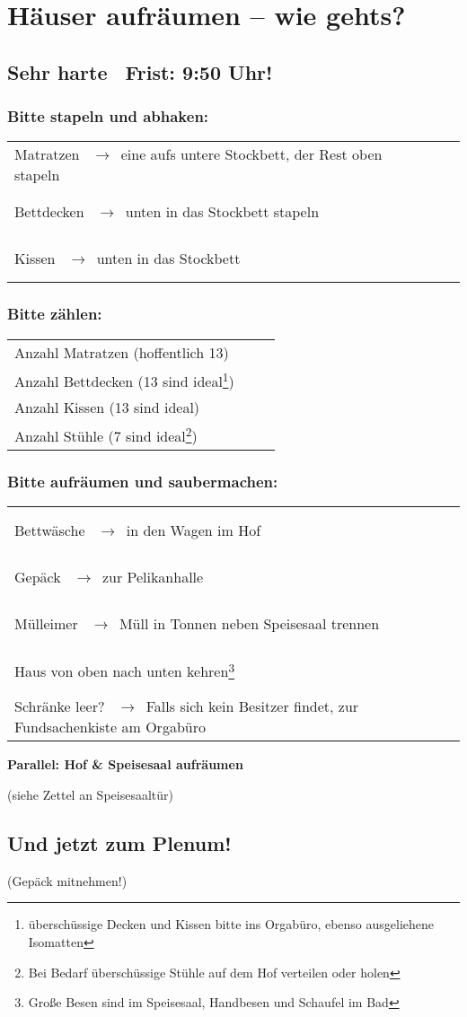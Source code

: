 \documentclass[14pt,parskip=full+]{scrartcl}
\newcommand{\checkfield}{~ \hfill ~\raisebox{-5pt}{\tikz\node[draw,minimum width=16.8pt,minimum height=16.8pt]{};}}
\newcommand{\countfield}{~ \hfill ~\raisebox{-5pt}{\tikz\node[draw,minimum width=33.6pt,minimum height=16.8pt]{};}}
\newcommand{\pfeil}{~\ensuremath{\rightarrow}~}
\newcommand{\mysection}[1]{\vspace{-.7\baselineskip}\subsubsection*{#1} \vspace{-.7\baselineskip}}
\begin{document}
\parbox[t]{.8\textwidth}{\vskip0pt
\section*{Häuser aufräumen -- wie gehts?}
\subsection*{Sehr harte\footnotemark~ Frist: 9:50 Uhr!}
}
\parbox[t]{.2\textwidth}{\vskip0pt 
}

\bigskip

\def\arraystretch{1.3}

\mysection{Bitte stapeln und abhaken:}
\begin{tabularx}{\textwidth}{Xc}
Matratzen \pfeil eine aufs untere Stockbett, der Rest oben stapeln & \checkfield \\
Bettdecken \pfeil unten in das Stockbett stapeln & \checkfield \\
Kissen \pfeil unten in das Stockbett & \checkfield
\end{tabularx}


\mysection{Bitte zählen:}
\begin{tabularx}{\textwidth}{Xc}
Anzahl Matratzen (hoffentlich 13) & \countfield \\
Anzahl Bettdecken (13 sind ideal\footnote{überschüssige Decken und Kissen bitte ins Orgabüro, ebenso ausgeliehene Isomatten}) & \countfield \\
Anzahl Kissen (13 sind ideal\footnotemark[2]) & \countfield \\
Anzahl Stühle (7 sind ideal\footnote{Bei Bedarf überschüssige Stühle auf dem Hof verteilen oder holen}) & \countfield
\end{tabularx}

\mysection{Bitte aufräumen und saubermachen:}
\begin{tabularx}{\textwidth}{Xc}
Bettwäsche \pfeil in den Wagen im Hof & \checkfield \\
Gepäck \pfeil zur Pelikanhalle & \checkfield \\
Mülleimer \pfeil Müll in Tonnen neben Speisesaal trennen & \checkfield \\
Haus von oben nach unten kehren\footnote{Große Besen sind im Speisesaal, Handbesen und Schaufel im Bad} & \checkfield \\
Schränke leer? \pfeil Falls sich kein Besitzer findet, zur Fundsachenkiste am Orgabüro & \checkfield
\end{tabularx}
 
\textbf{Parallel: Hof \& Speisesaal aufräumen}

(siehe Zettel an Speisesaaltür)

\subsection*{Und jetzt zum Plenum!}
\vspace{-\baselineskip}
(Gepäck mitnehmen!)
\end{document}
